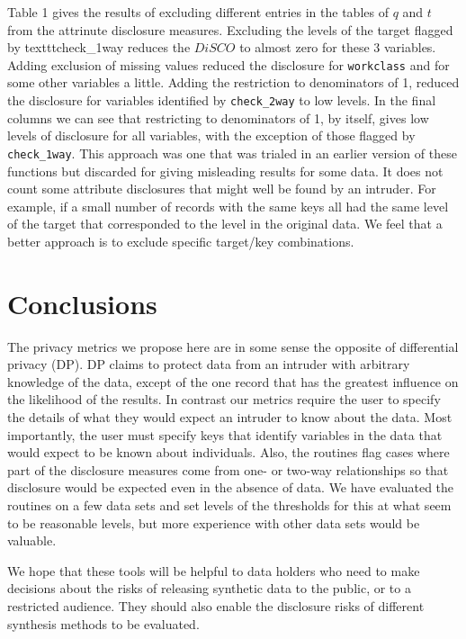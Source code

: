 \documentclass[12pt]{article}
\begin{document}
Table 1 gives the results of excluding different entries in the tables of $q$ and $t$ from the attrinute disclosure measures.
Excluding the levels of the target flagged by texttt{check\_1way} reduces the $DiSCO$ to almost zero for these 3 variables.
Adding exclusion of missing values reduced the disclosure for \texttt{workclass} and for some other variables a little. 
Adding the restriction to denominators of 1, reduced the disclosure for variables identified by \texttt{check\_2way} to low 
levels. In the final columns we can see that restricting to denominators of 1, by itself, gives low levels of disclosure for
all variables, with the exception of those flagged by \texttt{check\_1way}. This approach was one that was trialed in an earlier 
version of these functions but discarded for giving misleading results for some data. It does not count some attribute disclosures that might well be found by an intruder. For example, if a small number of records with the same keys all had the same level of the target that
corresponded to the level in the original data. We feel that a better approach is to exclude specific target/key combinations.

\section{Conclusions}
The privacy metrics we propose here are in some sense the opposite of differential privacy (DP).
DP claims to protect data from an intruder with arbitrary knowledge of the data, except of
the one record that has the greatest influence on the likelihood of the results. In contrast 
our metrics require the user to specify the details of what they would expect an intruder 
to know about the data. Most importantly, the user must specify keys that identify variables in the data
that would expect to be known about individuals. Also, the routines flag cases where part of the
disclosure measures come from one- or two-way relationships so that disclosure would be
expected even in the absence of data. We have evaluated the routines on a few data sets
and set levels of the thresholds for this at what seem to be reasonable levels, but 
more experience with other data sets would be valuable.

We hope that these tools will be helpful to data holders who need to make decisions 
about the risks of releasing synthetic data to the public, or to a restricted audience.
They should also enable the disclosure risks of different synthesis methods to be evaluated.
\end{document}
